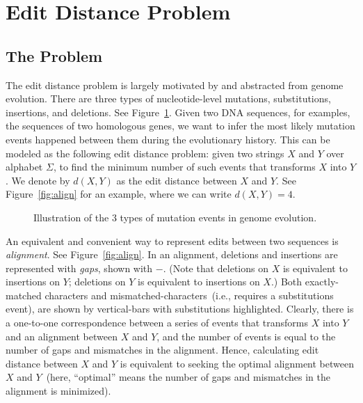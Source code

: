 \setcounter{definition}{0} \setcounter{property}{0} \setcounter{claim}{0} \setcounter{fact}{0} \setcounter{corollary}{0} \setcounter{figure}{0}
\section{Edit Distance Problem}

\subsection*{The Problem}

The edit distance problem is largely motivated by and abstracted from genome evolution.
There are three types of nucleotide-level mutations, substitutions, insertions, and deletions.
See Figure~\ref{fig:edits}. Given two DNA sequences, for examples, the sequences of two homologous genes,
we want to infer the most likely mutation events happened between them during the evolutionary history.
This can be modeled as the following edit distance problem: given two strings $X$ and $Y$ over alphabet $\Sigma$,
to find the minimum number of such events that transforms $X$ into $Y$.
We denote by $d(X, Y)$ as the edit distance between $X$ and $Y$.
See Figure~\ref{fig:align} for an example, where we can write $d(X, Y) = 4$.

\begin{figure}[h]
\centering{}
\caption{Illustration of the 3 types of mutation events in genome evolution.}
\label{fig:edits}
\end{figure}

An equivalent and convenient way to represent edits between two sequences 
is \emph{alignment}. See Figure~\ref{fig:align}.
In an alignment, deletions and insertions are represented with \emph{gaps}, shown with $-$.
(Note that deletions on $X$ is equivalent to insertions on $Y$;
deletions on $Y$ is equivalent to insertions on $X$.)
Both exactly-matched characters and mismatched-characters~(i.e., requires a substitutions event),
are shown by vertical-bars with substitutions highlighted.
Clearly, there is a one-to-one correspondence between a series
of events that transforms $X$ into $Y$ and an alignment between $X$ and $Y$,
and the number of events is equal to the number of gaps and mismatches in the alignment.
Hence, calculating edit distance between $X$ and $Y$ is equivalent to
seeking the optimal alignment between $X$ and $Y$~(here, ``optimal'' means
the number of gaps and mismatches in the alignment is minimized).

